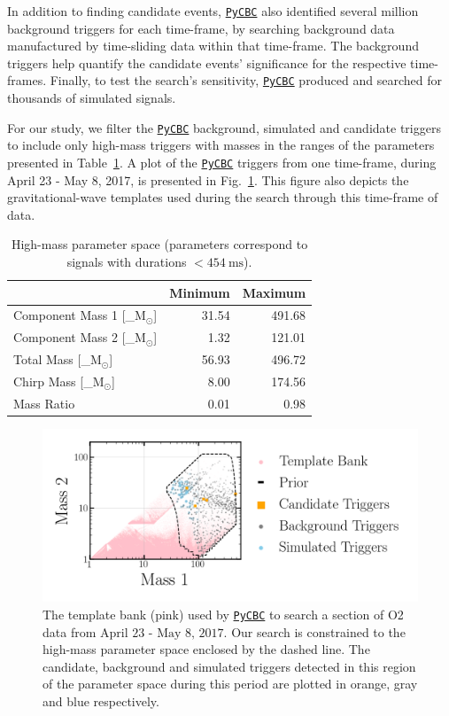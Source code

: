 \documentclass[%
 nofootinbib,
 amsmath,amssymb,
 aps,
 twocolumn,
 superscriptaddress
]{revtex4-2}
\newcommand{\pycbc}{{\sc \href{https://pycbc.org/}{\texttt{PyCBC}}}\xspace}
\newcommand{\mathcmd}[1]{{\sc \relax\ifmmode#1\else $#1$\fi}\xspace}
\newcommand{\msun}{\mathcmd{\text{M}_\odot}}
\begin{document}
In addition to finding candidate events, \pycbc also identified several million background triggers for each time-frame, by searching background data manufactured by time-sliding data within that time-frame. The background triggers help quantify the candidate events' significance for the respective time-frames. Finally, to test the search's sensitivity, \pycbc produced and searched for thousands of simulated signals. 

For our study, we filter the \pycbc background, simulated and candidate triggers to include only high-mass triggers with masses in the ranges of the parameters presented in Table~\ref{tab:parameters}. A plot of the \pycbc triggers from one time-frame, during April 23 - May 8, 2017, is presented in Fig.~\ref{fig:templateBank}. This figure also depicts the gravitational-wave templates used during the search through this time-frame of data. 

\begin{table}[t]

\caption[BBH parameters correspond to duration $<454\ \text{ms}$]{\label{tab:parameters}High-mass parameter space (parameters correspond to signals with durations $<454 \ \text{ms}$). }
\centering
\begin{tabular}{lrr}
\toprule
  & Minimum & Maximum\\
\midrule
Component Mass 1 [\msun] & 31.54 & 491.68\\
Component Mass 2 [\msun] & 1.32 & 121.01\\
Total Mass [\msun] & 56.93 & 496.72\\
Chirp Mass [\msun] & 8.00 & 174.56\\
Mass Ratio & 0.01 & 0.98\\
\end{tabular}
\end{table}



\begin{figure}[!ht]

{\centering \includegraphics[width=0.75\linewidth]{images/template_bank.png}

}
\caption[High-mass BCR search space.]{The template bank (pink) used by \pycbc to search a section of O2 data from $\text{April 23 - May 8, 2017}$. Our search is constrained to the high-mass parameter space enclosed by the dashed line. The candidate, background and simulated triggers detected in this region of the parameter space during this period are plotted in orange, gray and blue respectively.}\label{fig:templateBank}
\end{figure}
\end{document}

